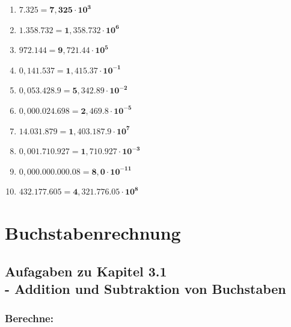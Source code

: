 \documentclass[a4paper,12pt]{article} %
\begin{document}
\begin{enumerate}[label=\alph*)]

  \item \(7.325 = \mathbf{7,325 \cdot 10^3}\) %

  \item \(1.358.732 = \mathbf{1,358.732 \cdot 10^6}\) %

  \item \(972.144 = \mathbf{9,721.44 \cdot 10^5}\) %

  \item \(0,141.537 = \mathbf{1,415.37 \cdot 10^{-1}}\) %

  \item \(0,053.428.9 = \mathbf{5,342.89 \cdot 10^{-2}}\) %

  \item \(0,000.024.698 = \mathbf{2,469.8 \cdot 10^{-5}}\) %

  \item \(14.031.879 = \mathbf{1,403.187.9 \cdot 10^7}\) %

  \item \(0,001.710.927 = \mathbf{1,710.927 \cdot 10^{-3}}\) %

  \item \(0,000.000.000.08 = \mathbf{8,0 \cdot 10^{-11}}\) %

  \item \(432.177.605 = \mathbf{4,321.776.05 \cdot 10^8}\) %

\end{enumerate}

\section{Buchstabenrechnung}

\subsection{Aufagaben zu Kapitel 3.1 \\
  - Addition und Subtraktion von Buchstaben}

\subsubsection{Berechne:} %
\end{document}
